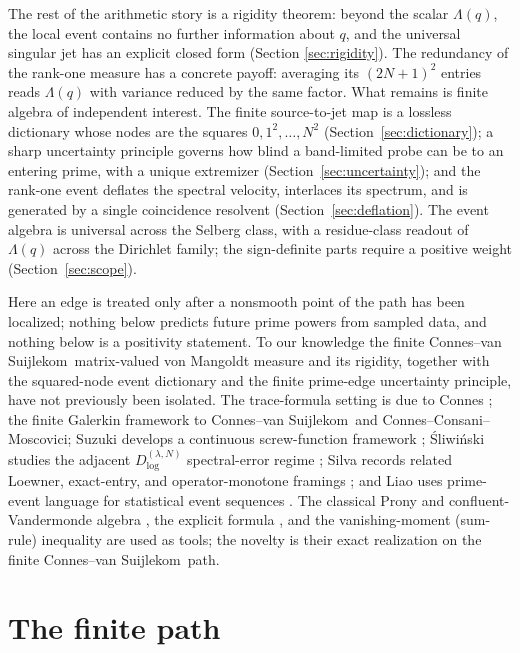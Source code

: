 \documentclass[11pt]{article}
\theoremstyle{plain}
\theoremstyle{definition}
\theoremstyle{remark}
\newcommand{\cvs}{Connes--van Suijlekom}
\newcommand{\ccm}{Connes--Consani--Moscovici}
\newcommand{\Lam}{\Lambda}
\begin{document}
The rest of the arithmetic story is a rigidity theorem: beyond the scalar
$\Lam(q)$, the local event contains no further information about $q$, and the
universal singular jet has an explicit closed form (Section
\ref{sec:rigidity}). The redundancy of the rank-one measure has a concrete
payoff: averaging its $(2N+1)^2$ entries reads $\Lam(q)$ with variance reduced by
the same factor. What remains is finite algebra of independent interest. The
finite source-to-jet map is a lossless dictionary whose nodes are the squares
$0,1^{2},\dots,N^{2}$ (Section~\ref{sec:dictionary}); a sharp uncertainty
principle governs how blind a band-limited probe can be to an entering prime,
with a unique extremizer (Section~\ref{sec:uncertainty}); and the rank-one
event deflates the spectral velocity, interlaces its spectrum, and is generated
by a single coincidence resolvent (Section~\ref{sec:deflation}). The event
algebra is universal across the Selberg class, with a residue-class readout of
$\Lam(q)$ across the Dirichlet family; the sign-definite parts require a positive
weight (Section~\ref{sec:scope}).

Here an edge is treated only after a nonsmooth point of the path has been
localized; nothing below predicts future prime powers from sampled data, and
nothing below is a positivity statement. To our knowledge the finite \cvs\
matrix-valued von Mangoldt measure and its rigidity, together with the
squared-node event dictionary and the finite prime-edge uncertainty principle,
have not previously been isolated. The trace-formula setting is due to Connes
\cite{Connes1999,Connes2026}; the finite Galerkin framework to \cvs\ and \ccm;
Suzuki develops a continuous screw-function framework
\cite{Suzuki2026}; Śliwiński studies the adjacent $D_{\log}^{(\lambda,N)}$
spectral-error regime \cite{Sliwinski2026}; Silva records related Loewner,
exact-entry, and operator-monotone framings
\cite{Silva20710075,Silva20737111,Silva20671635}; and Liao uses prime-event
language for statistical event sequences \cite{Liao2026}. The classical Prony
and confluent-Vandermonde algebra
\cite{Prony1795,Gautschi1962,BatenkovYomdin2013}, the explicit formula
\cite{Weil1952,IwaniecKowalski2004}, and the vanishing-moment (sum-rule)
inequality \cite{Daubechies1992} are used as tools; the novelty is their exact
realization on the finite \cvs\ path.

\section{The finite path}\label{sec:path}
\end{document}

